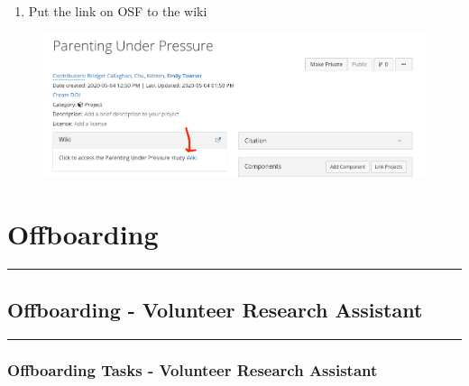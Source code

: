 \documentclass[]{book}
\providecommand{\tightlist}{%
  \setlength{\itemsep}{0pt}\setlength{\parskip}{0pt}}
\begin{document}
\begin{enumerate}
\def\labelenumi{\arabic{enumi}.}
\setcounter{enumi}{6}
\tightlist
\item
  Put the link on OSF to the wiki
\end{enumerate}

\begin{figure}
\centering
\includegraphics{images/research_protocols/wiki/7.png}
\caption{}
\end{figure}

\hypertarget{offboarding}{%
\chapter{Offboarding}\label{offboarding}}

\begin{center}\rule{0.5\linewidth}{0.5pt}\end{center}

\hypertarget{offboarding---volunteer-research-assistant}{%
\section{Offboarding - Volunteer Research Assistant}\label{offboarding---volunteer-research-assistant}}

\begin{center}\rule{0.5\linewidth}{0.5pt}\end{center}

\hypertarget{offboarding-tasks---volunteer-research-assistant}{%
\subsection{Offboarding Tasks - Volunteer Research Assistant}\label{offboarding-tasks---volunteer-research-assistant}}
\end{document}
